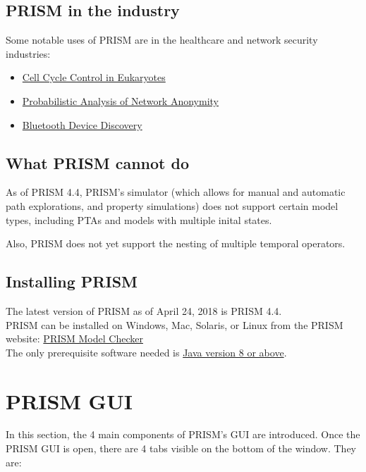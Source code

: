 \documentclass[a4paper]{article}
\begin{document}
\subsection{PRISM in the industry}
Some notable uses of PRISM are in the healthcare and network security industries:
\begin{itemize}
\item \href{http://www.prismmodelchecker.org/casestudies/cyclin.php}{Cell Cycle Control in Eukaryotes}
\item \href{https://pure.tue.nl/ws/files/46991351/614142-1.pdf}{Probabilistic Analysis of Network Anonymity}

\item \href{https://www.cs.bham.ac.uk/~parkerdx/papers/isola04.pdf}{Bluetooth Device Discovery}
\end{itemize}

\subsection{What PRISM cannot do}
As of PRISM 4.4, PRISM's simulator (which allows for manual and automatic path explorations, and property simulations) does not support certain model types, including PTAs and models with multiple inital states. 

Also, PRISM does not yet support the nesting of multiple temporal operators. 

\subsection{Installing PRISM}

The latest version of PRISM as of April 24, 2018 is PRISM 4.4.
\\[1\baselineskip]
PRISM can be installed on Windows, Mac, Solaris, or Linux from the PRISM website: \href{http://www.prismmodelchecker.org/download.php}{PRISM Model Checker}
\\[1\baselineskip]
The only prerequisite software needed is \href{http://www.oracle.com/technetwork/java/javase/downloads/index.html}{Java version 8 or above}.


\section{PRISM GUI}
In this section, the 4 main components of PRISM's GUI are introduced.
\newline
Once the PRISM GUI is open, there are 4 tabs visible on the bottom of the window. They are:
\end{document}

